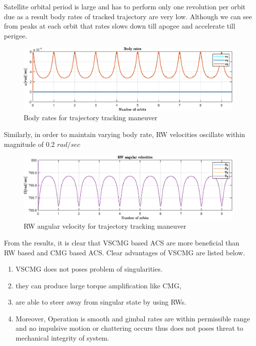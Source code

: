 Satellite orbital period is large and has to perform only one revolution per orbit due as a result body rates of tracked trajectory are very low. Although we can see from peaks at each orbit that rates slows down till apogee and accelerate till perigee.
\begin{figure}[H]
     \centering
    \includegraphics[width=0.9\columnwidth]{figures/plots/VSCMG/vs_ref_mol_w.eps}
    \caption{Body rates for trajectory tracking maneuver}
    \label{plt:vs_ref_mol_w}
\end{figure}
\noindent Similarly, in order to maintain varying body rate, RW velocities oscillate within magnitude of 0.2 $rad/sec$
\begin{figure}[H]
     \centering
    \includegraphics[width=0.9\columnwidth]{figures/plots/VSCMG/vs_ref_mol_Om.eps}
    \caption{RW angular velocity for trajectory tracking maneuver}
    \label{plt:vs_ref_mol_Om}
\end{figure}

From the results, it is clear that VSCMG based ACS are more beneficial than RW based and CMG based ACS. Clear advantages of VSCMG are listed below.

\begin{enumerate}
    \item VSCMG does not poses problem of singularities.
    \item they can produce large torque amplification like CMG,
    \item are able to steer away from singular state by using RWs.
    \item Moreover, Operation is smooth and gimbal rates are within permissible range and no impulsive motion or chattering occurs thus does not poses threat to mechanical integrity of system.
\end{enumerate}